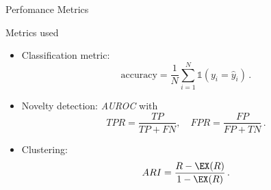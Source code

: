 \begin{frame}{Perfomance Metrics}
    \begin{normalblock}{Metrics used}
        \begin{itemize}
          \item<1-> Classification metric:
          \[
              \text{accuracy} = \frac{1}{N}\sum_{i=1}^N \mathds{1} (y_i = \hat{y}_i)\,.
          \]
          \item<2-> Novelty detection: \emph{AUROC} with 
          \[
              TPR = \frac{TP}{TP+FN}, \quad FPR = \frac{FP}{FP+TN}\,.
          \]
          \item<3-> Clustering: 
          \[
              ARI = \frac{R-\EX(R)}{1-\EX(R)}\,.
          \]
        \end{itemize}
    \end{normalblock}
\end{frame}